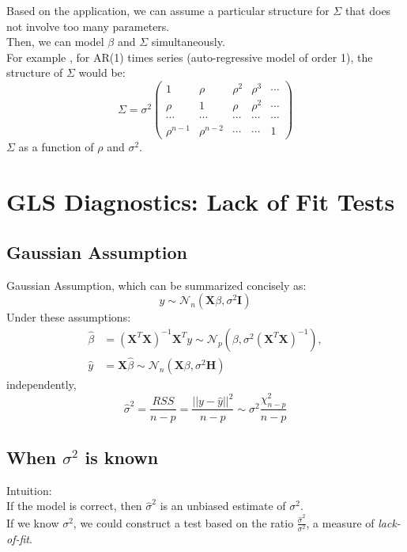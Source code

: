\documentclass[11pt,a4paper]{article}
\begin{document}
Based on the application, we can assume a particular structure for $\Sigma$ that does not involve too many parameters.\\
Then, we can model $\beta$ and $\Sigma$ simultaneously.\\
For example , for AR(1) times series (auto-regressive model of order 1),
the structure of $\Sigma$ would be:
$$\Sigma=\sigma^2 \begin{pmatrix}
    1& \rho& \rho^2& \rho^3& \cdots\\
    \rho& 1& \rho& \rho^2& \cdots \\
    \cdots & \cdots& \cdots &\cdots&\cdots \\
    \rho^{n-1}& \rho^{n-2}&\cdots&\cdots&1
\end{pmatrix}$$
$\Sigma$ as a function of $\rho$ and $\sigma^2$.

\section{ GLS Diagnostics: Lack of Fit Tests}
\subsection{Gaussian Assumption}
Gaussian Assumption, which can be summarized concisely as:
$$y\sim \mathcal{N}_{n}(\mathbf{X}\beta, \sigma^2 \mathbf{I})$$
Under these assumptions:
\begin{equation}
    \begin{aligned}
        \hat{\beta}&=\left(\mathbf{X}^{T} \mathbf{X}\right)^{-1} \mathbf{X}^{T} y\sim \mathcal{N}_{p}(\beta,\sigma^2\left(\mathbf{X}^{T} \mathbf{X}\right)^{-1}),\\
        \hat{y}&=\mathbf{X}\hat{\beta}\sim \mathcal{N}_{n}(\mathbf{X}\beta, \sigma^2 \mathbf{H})
    \end{aligned}
    \nonumber
\end{equation}
independently,
$$\hat{\sigma}^2=\frac{RSS}{n-p}=\frac{||y-\hat{y}||^2}{n-p}\sim \sigma^2\frac{\chi^2_{n-p}}{n-p}$$

\subsection{When $\sigma^2$ is known}
Intuition:\\
If the model is correct, then $\hat{\sigma}^2$ is an unbiased estimate of $\sigma^2$.\\
If we know $\sigma^2$, we could construct a test based on the ratio $\frac{\hat{\sigma}^2}{\sigma^2}$, a measure of \textit{lack-of-ﬁt}.
\end{document}

